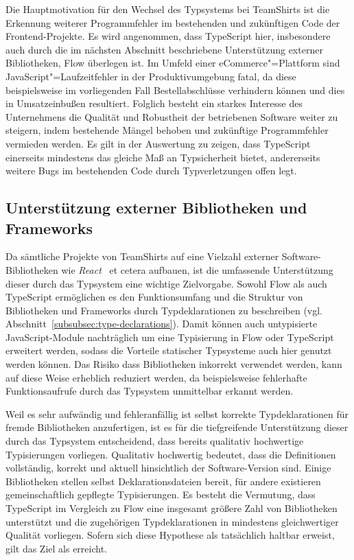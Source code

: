 Die Hauptmotivation für den Wechsel des Typsystems bei TeamShirts ist die Erkennung weiterer Programmfehler im bestehenden und zukünftigen Code der Frontend-Projekte. Es wird angenommen, dass TypeScript hier, insbesondere auch durch die im nächsten Abschnitt beschriebene Unterstützung externer Bibliotheken, Flow überlegen ist. Im Umfeld einer eCommerce"=Plattform sind JavaScript"=Laufzeitfehler in der Produktivumgebung fatal, da diese beispielsweise im vorliegenden Fall Bestellabschlüsse verhindern können und dies in Umsatzeinbußen resultiert. Folglich besteht ein starkes Interesse des Unternehmens die Qualität und Robustheit der betriebenen Software weiter zu steigern, indem bestehende Mängel behoben und zukünftige Programmfehler vermieden werden. Es gilt in der Auswertung zu zeigen, dass TypeScript einerseits mindestens das gleiche Maß an Typsicherheit bietet, andererseits weitere Bugs im bestehenden Code durch Typverletzungen offen legt.

\subsection{Unterstützung externer Bibliotheken und Frameworks}

Da sämtliche Projekte von TeamShirts auf eine Vielzahl externer Software-Bibliotheken wie \textit{React}~\autocite{SOFTWARE:REACT} et cetera aufbauen, ist die umfassende Unterstützung dieser durch das Typsystem eine wichtige Zielvorgabe. Sowohl Flow als auch TypeScript ermöglichen es den Funktionsumfang und die Struktur von Bibliotheken und Frameworks durch Typdeklarationen zu beschreiben (vgl. Abschnitt~\ref{subsubsec:type-declarations}). Damit können auch untypisierte JavaScript-Module nachträglich um eine Typisierung in Flow oder TypeScript erweitert werden, sodass die Vorteile statischer Typsysteme auch hier genutzt werden können. Das Risiko dass Bibliotheken inkorrekt verwendet werden, kann auf diese Weise erheblich reduziert werden, da beispielsweise fehlerhafte Funktionsaufrufe durch das Typsystem unmittelbar erkannt werden.

Weil es sehr aufwändig und fehleranfällig ist selbst korrekte Typdeklarationen für fremde Bibliotheken anzufertigen, ist es für die tiefgreifende Unterstützung dieser durch das Typsystem entscheidend, dass bereits qualitativ hochwertige Typisierungen vorliegen. Qualitativ hochwertig bedeutet, dass die Definitionen vollständig, korrekt und aktuell hinsichtlich der Software-Version sind. Einige Bibliotheken stellen selbst Deklarationsdateien bereit, für andere existieren gemeinschaftlich gepflegte Typisierungen. Es besteht die Vermutung, dass TypeScript im Vergleich zu Flow eine insgesamt größere Zahl von Bibliotheken unterstützt und die zugehörigen Typdeklarationen in mindestens gleichwertiger Qualität vorliegen. Sofern sich diese Hypothese als tatsächlich haltbar erweist, gilt das Ziel als erreicht.

